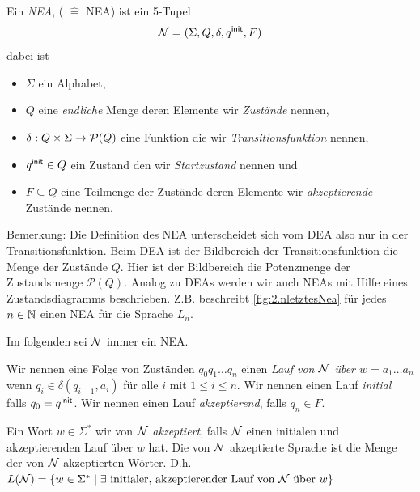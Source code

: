 \begin{Def}
        Ein \emph{\acf{NEA}}, ( $\hat=$ \acl{NEA}) ist ein 5-Tupel
        \[ \mathcal{N}= (\Sigma, Q,\delta,{q^\mathsf{init}},F) \]
dabei ist
        \begin{itemize}
                \item $\Sigma$ ein Alphabet,
                \item $Q$ eine \emph{endliche} Menge deren Elemente wir \emph{Zustände} nennen,
                \item $\delta:Q\x\Sigma\->\mathcal{P}(Q)$ eine Funktion die wir \emph{Transitionsfunktion} nennen,
                \item ${q^\mathsf{init}}\in Q$ ein Zustand den wir \emph{Startzustand} nennen und
                \item $F\subseteq Q$ eine Teilmenge der Zustände deren Elemente wir \emph{akzeptierende} Zustände nennen.
        \end{itemize}
\end{Def}
Bemerkung: Die Definition des NEA unterscheidet sich vom DEA also nur in der Transitionsfunktion. Beim DEA ist der Bildbereich der Transitionsfunktion die Menge der Zustände $Q$. Hier ist der Bildbereich die Potenzmenge der Zustandsmenge $\mathcal{P}(Q)$.
Analog zu DEAs werden wir auch NEAs mit Hilfe eines Zustandsdiagramms beschrieben. Z.B. beschreibt \autoref{fig:2.nletztesNea} für jedes $n\in\mathbb{N}$ einen NEA für die Sprache $L_n$.

Im folgenden sei $\mathcal{N}$ immer ein NEA.
\begin{Def}[name={[Lauf eines Automaten]}]
	Wir nennen eine Folge von Zuständen $q_0q_1\dots q_n$ einen \emph{Lauf von $\mathcal{N}$ über $w=a_1\dots a_n$} wenn
	$q_i\in\delta(q_{i-1},a_i)$ für alle $i$ mit $1\leq i\leq n$.
	Wir nennen einen Lauf \emph{initial} falls $q_0={q^\mathsf{init}}$.
	Wir nennen einen Lauf \emph{akzeptierend}, falls $q_n\in F$.
\end{Def}
\begin{Def}[name={[NEA zu DEA]}]
	Ein Wort $w\in\Sigma^*$ wir von $\mathcal{N}$ \emph{akzeptiert}, falls $\mathcal{N}$ einen initialen und akzeptierenden Lauf über $w$ hat.
	Die von $\mathcal{N}$ akzeptierte Sprache ist die Menge der von $\mathcal{N}$ akzeptierten Wörter. D.h.	
	$L(\mathcal{N})=\{ w\in\Sigma^* \mid \exists\text{ initialer, akzeptierender Lauf von $\mathcal{N}$ über }w \}$
\end{Def}




